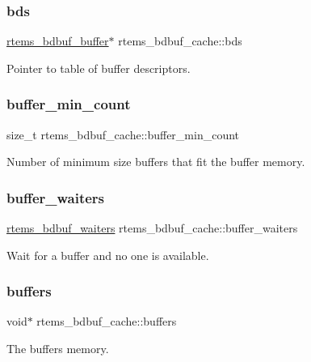 \subsubsection{\texorpdfstring{bds}{bds}}
{\footnotesize\ttfamily \mbox{\hyperlink{structrtems__bdbuf__buffer}{rtems\+\_\+bdbuf\+\_\+buffer}}$\ast$ rtems\+\_\+bdbuf\+\_\+cache\+::bds}

Pointer to table of buffer descriptors. \mbox{\label{structrtems__bdbuf__cache_aa4f14abf46f5285c7ccb01918c4d79ba}} 
\subsubsection{\texorpdfstring{buffer\_min\_count}{buffer\_min\_count}}
{\footnotesize\ttfamily size\+\_\+t rtems\+\_\+bdbuf\+\_\+cache\+::buffer\+\_\+min\+\_\+count}

Number of minimum size buffers that fit the buffer memory. \mbox{\label{structrtems__bdbuf__cache_aef01ed3354d0b912a29ebd8942e567cb}} 
\subsubsection{\texorpdfstring{buffer\_waiters}{buffer\_waiters}}
{\footnotesize\ttfamily \mbox{\hyperlink{structrtems__bdbuf__waiters}{rtems\+\_\+bdbuf\+\_\+waiters}} rtems\+\_\+bdbuf\+\_\+cache\+::buffer\+\_\+waiters}

Wait for a buffer and no one is available. \mbox{\label{structrtems__bdbuf__cache_a1e1e8fc29f39dad8947ac36f186d4012}} 
\subsubsection{\texorpdfstring{buffers}{buffers}}
{\footnotesize\ttfamily void$\ast$ rtems\+\_\+bdbuf\+\_\+cache\+::buffers}

The buffer\textquotesingle{}s memory. \mbox{\label{structrtems__bdbuf__cache_a932ac81fcb0fe3dc603899fa23992617}} 
